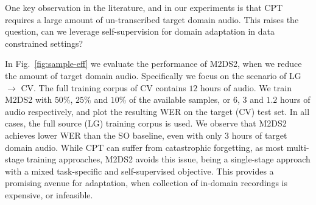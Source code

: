 \documentclass[journal]{IEEEtran}
\begin{document}
One key observation in the literature, and in our experiments is that CPT requires a large amount of un-transcribed target domain audio. This raises the question, can we leverage self-supervision for domain adaptation in data constrained settings?

In Fig.~\ref{fig:sample-eff} we evaluate the performance of M2DS2, when we reduce the amount of target domain audio. Specifically we focus on the scenario of LG $\rightarrow$ CV. The full training corpus of CV contains $12$ hours of audio. We train M2DS2 with $50\%$, $25\%$ and $10\%$ of the available samples, or $6$, $3$ and $1.2$ hours of audio respectively, and plot the resulting WER on the target (CV) test set. In all cases, the full source (LG) training corpus is used.
We observe that M2DS2 achieves lower WER than the SO baseline, even with only $3$  hours of target domain audio. While CPT can suffer from catastrophic forgetting, as most multi-stage training approaches, M2DS2 avoids this issue, being a single-stage approach with a mixed task-specific and self-supervised objective.
This provides a promising avenue for adaptation, when collection of in-domain recordings is expensive, or infeasible.




\end{document}

